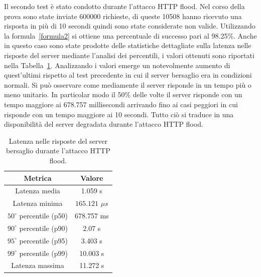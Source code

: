 Il secondo test è stato condotto durante l'attacco HTTP flood. Nel corso della prova sono state inviate 600000 richieste, di queste 10508 hanno ricevuto una risposta in più di 10 secondi quindi sono state considerate non valide. Utilizzando la formula~\ref{formula2} si ottiene una percentuale di successo pari al 98.25\%. Anche in questo caso sono state prodotte delle statistiche dettagliate sulla latenza nelle risposte del server mediante l'analisi dei percentili, i valori ottenuti sono riportati nella Tabella~\ref{latenza_attacco}. Analizzando i valori emerge un notevolmente aumento di quest'ultimi rispetto al test precedente in cui il server bersaglio era in condizioni normali. Si può osservare come mediamente il server risponde in un tempo più o meno unitario. In particolar modo il 50\% delle volte il server risponde con un tempo maggiore ai 678.757 millisecondi arrivando fino ai casi peggiori in cui risponde con un tempo maggiore ai 10 secondi. Tutto ciò si traduce in una disponibilità del server degradata durante l'attacco HTTP flood.
\begin{table}[H]
        \centering
        \begin{tabular}{c c}
        \hline
        \textbf{Metrica} & \textbf{Valore} \\
        \hline
        Latenza media & 1.059 s \\
        Latenza minima & $ 165.121$ $\mu s$ \\
        $50^\circ$ percentile (p50) & 678.757 ms\\
        $90^\circ$ percentile (p90) & 2.07 s \\
        $95^\circ$ percentile (p95) & 3.403 s \\
        $99^\circ$ percentile (p99) & 10.003 s \\
        Latenza massima  & 11.272 s \\
        \hline
        \end{tabular}
        \caption{Latenza nelle risposte del server bersaglio durante l'attacco HTTP flood.}
        \label{latenza_attacco}
\end{table}


 
 





    
